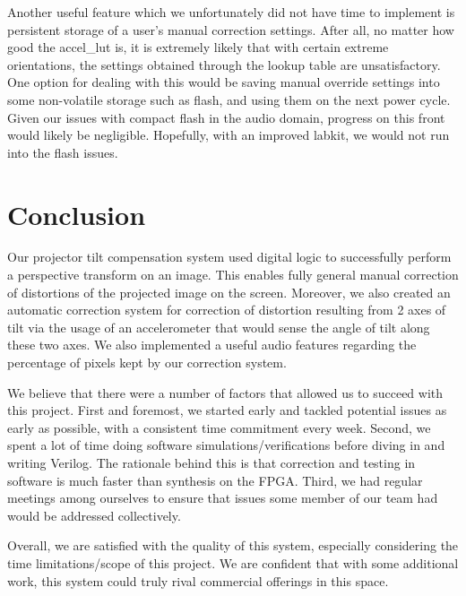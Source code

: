 \documentclass{article}
\begin{document}
Another useful feature which we unfortunately did not have time to implement is persistent storage of a user's manual correction settings.
After all, no matter how good the accel\_lut is, it is extremely likely that with certain extreme orientations,
the settings obtained through the lookup table are unsatisfactory.
One option for dealing with this would be saving manual override settings into some non-volatile storage such as flash,
and using them on the next power cycle.
Given our issues with compact flash in the audio domain, progress on this front would likely be negligible.
Hopefully, with an improved labkit, we would not run into the flash issues.

\section{Conclusion}
Our projector tilt compensation system used digital logic to successfully perform a perspective transform on an image.
This enables fully general manual correction of distortions of the projected image on the screen.
Moreover, we also created an automatic correction system for correction of distortion resulting from 2 axes of tilt
via the usage of an accelerometer that would sense the angle of tilt along these two axes.
We also implemented a useful audio features regarding the percentage of pixels kept by our correction system.

We believe that there were a number of factors that allowed us to succeed with this project.
First and foremost, we started early and tackled potential issues as early as possible, with a consistent time commitment every week.
Second, we spent a lot of time doing software simulations/verifications before diving in and writing Verilog.
The rationale behind this is that correction and testing in software is much faster than synthesis on the FPGA.
Third, we had regular meetings among ourselves to ensure that issues some member of our team had would be addressed collectively.

Overall, we are satisfied with the quality of this system,
especially considering the time limitations/scope of this project.
We are confident that with some additional work,
this system could truly rival commercial offerings in this space.



\newpage

\appendix
\end{document}
